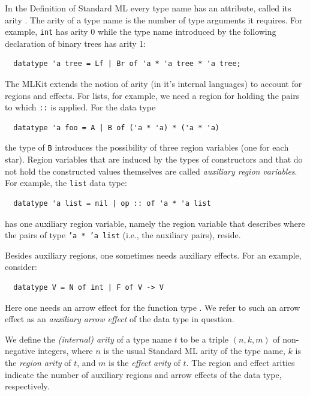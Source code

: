 \documentclass[12pt]{book}
\begin{document}
In the Definition of Standard ML every type name has an attribute,
called its arity \cite[page 15]{mthm97}. The arity of a type name is the number
of type arguments it requires. For example, {\tt int} has arity 0
while the type name introduced by the following declaration of binary
trees has arity 1:
%
%
%
%
\begin{verbatim}
  datatype 'a tree = Lf | Br of 'a * 'a tree * 'a tree;
\end{verbatim}

The MLKit extends the notion of arity (in it's internal languages) to
account for regions and effects. For lists, for example, we need a
region for holding the pairs to which {\tt ::} is applied. For the
data type
\begin{verbatim}
  datatype 'a foo = A | B of ('a * 'a) * ('a * 'a)
\end{verbatim}
the type of {\tt B} introduces the possibility of three region
variables (one for each star). Region variables that are induced by
the types of constructors and that do not hold the constructed values
themselves are called
%
{\em auxiliary region variables}. For example, the {\tt list} data
type:
\begin{verbatim}
  datatype 'a list = nil | op :: of 'a * 'a list
\end{verbatim}
has one auxiliary region variable, namely the region variable that
describes where the pairs of type {\tt 'a * 'a list} (i.e., the
auxiliary
%
pairs), reside.

Besides auxiliary regions, one sometimes needs auxiliary effects.  For
an example, consider:
\begin{verbatim}
  datatype V = N of int | F of V -> V
\end{verbatim}
Here one needs an arrow effect for the function type .
We refer to such an arrow effect as an
%
{\em auxiliary arrow effect} of the data type in question.


We define the {\em (internal) arity} of a type name $t$ to be a triple
$(n,k,m)$ of non-negative integers, where $n$ is the usual Standard ML
arity of the type name, $k$ is the
%
{\em region arity} of $t$, and $m$ is the
%
{\em effect arity} of $t$. The region and effect arities indicate the
number of auxiliary regions and arrow effects of the data type,
respectively.
\end{document}
